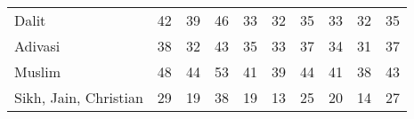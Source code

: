 \begin{tabular}{l*{9}{c}}
Dalit               &          42&          39&          46&          33&          32&          35&          33&          32&          35\\
Adivasi             &          38&          32&          43&          35&          33&          37&          34&          31&          37\\
Muslim              &          48&          44&          53&          41&          39&          44&          41&          38&          43\\
Sikh, Jain, Christian&          29&          19&          38&          19&          13&          25&          20&          14&          27\\
\bottomrule
\end{tabular}
